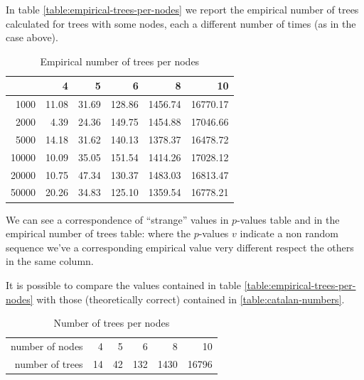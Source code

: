 In table \autoref{table:empirical-trees-per-nodes} we report the
empirical number of trees calculated for trees with some nodes, each a
different number of times (as in the case above).
\begin{table}[ht]
  \begin{center}
    \begin{tabular}{rrrrrr}
      \hline
      & 4 & 5 & 6 & 8 & 10 \\ 
      \hline
      1000 & 11.08 & 31.69 & 128.86 & 1456.74 & 16770.17 \\ 
      2000 & 4.39 & 24.36 & 149.75 & 1454.88 & 17046.66 \\ 
      5000 & 14.18 & 31.62 & 140.13 & 1378.37 & 16478.72 \\ 
      10000 & 10.09 & 35.05 & 151.54 & 1414.26 & 17028.12 \\ 
      20000 & 10.75 & 47.34 & 130.37 & 1483.03 & 16813.47 \\ 
      50000 & 20.26 & 34.83 & 125.10 & 1359.54 & 16778.21 \\ 
      \hline
    \end{tabular}
    \caption{Empirical number of trees per nodes}
    \label{table:empirical-trees-per-nodes}
  \end{center}
\end{table}
We can see a correspondence of ``strange'' values in $p$-values table
and in the empirical number of trees table: where the $p$-values $v$
indicate a non random sequence we've a corresponding empirical value
very different respect the others in the same column.

It is possible to compare the values contained in table
\autoref{table:empirical-trees-per-nodes} with those (theoretically
correct) contained in \autoref{table:catalan-numbers}.
\begin{table}[ht]
  \begin{center}
    \begin{tabular}{rrrrrr}
      \hline
      number of nodes & 4 & 5 & 6 & 8 & 10 \\ 
      number of trees & 14 & 42 & 132 & 1430 & 16796 \\ 
      \hline
    \end{tabular}
    \caption{Number of trees per nodes}
    \label{table:catalan-numbers}
  \end{center}
\end{table}


%

